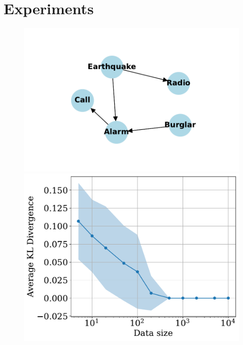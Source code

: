 \section{Experiments}
\begin{figure}
    \centering
    \begin{minipage}{\textwidth}
    \includegraphics[width = \linewidth]{plots/alarm.pdf}
    \end{minipage}
    \begin{minipage}{0.435\textwidth}
    \includegraphics[width = \linewidth]{plots/kl_divergence.pdf}
    \end{minipage}
    \begin{minipage}{0.4\textwidth}

\end{minipage}
\end{figure}
